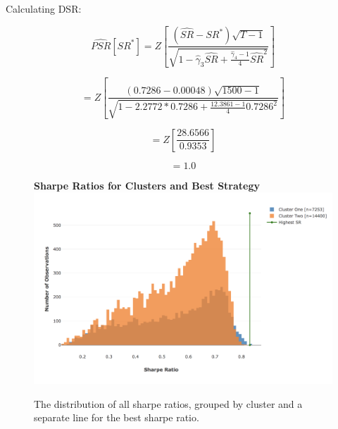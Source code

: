 \documentclass[a4paper,11pt,oneside]{article}
\theoremstyle{plain}
\theoremstyle{definition}
\begin{document}
Calculating DSR:

 \begin{equation}
 \widehat{P S R}\left[S R^{*}\right]=Z\left[\frac{\left(\widehat{S R}-S R^{*}\right) \sqrt{T-1}}{\sqrt{1-\hat{\gamma}_{3} \widehat{S R}+\frac{\hat{\gamma}_{4}-1}{4} \widehat{S R}^{2}}}\right]
 \end{equation}

 \begin{equation}
=Z\left[\frac{\left({0.7286}-{0.00048}\right) \sqrt{1500-1}}{\sqrt{1-{2.2772}\ast{0.7286}+\frac{{12.3861}-1}{4}{0.7286}^{2}}}\right]
\end{equation}

 \begin{equation}
=Z\left[\frac{28.6566}{0.9353}\right]
\end{equation}

 \begin{equation}
= {1.0}
\end{equation}

\begin{figure}[H]
	\centering
	\textbf{Sharpe Ratios for Clusters and Best Strategy}
	\includegraphics[scale=0.35]{images/results/dsr/cluster_sr.png} 
	\caption{
		\newline The distribution of all sharpe ratios, grouped by cluster and a separate line for the best sharpe ratio.}
	\label{figure-dsr_sr}
\end{figure}
\end{document}
